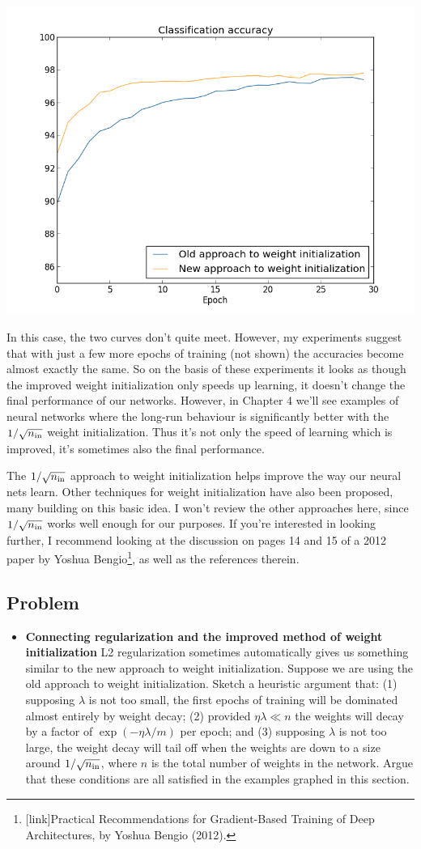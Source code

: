 \documentclass[a4paper,twoside,10pt]{book}
\begin{document}
\begin{center}
	\includegraphics[width=0.7\linewidth]{figures/ch3/weight_initialization_100}
\end{center}
In this case, the two curves don't quite meet. However, my experiments suggest that with just a few more epochs of training (not shown) the accuracies become almost exactly the same. So on the basis of these experiments it looks as though the improved weight initialization only speeds up learning, it doesn't change the final performance of our networks. However, in Chapter 4 we'll see examples of neural networks where the long-run behaviour is significantly better with the $1/\sqrt{n_{\rm in}}$ weight initialization. Thus it's not only the speed of learning which is improved, it's sometimes also the final performance.

The $1/\sqrt{n_{\rm in}}$ approach to weight initialization helps improve the way our neural nets learn. Other techniques for weight initialization have also been proposed, many building on this basic idea. I won't review the other approaches here, since $1/\sqrt{n_{\rm in}}$ works well enough for our purposes. If you're interested in looking further, I recommend looking at the discussion on pages 14 and 15 of a 2012 paper by Yoshua Bengio\footnote{[link]Practical Recommendations for Gradient-Based Training of Deep Architectures, by Yoshua Bengio (2012).}, as well as the references therein.

\subsection*{Problem}
\begin{itemize}
	\item \textbf{Connecting regularization and the improved method of weight initialization} L2 regularization sometimes automatically gives us something similar to the new approach to weight initialization. Suppose we are using the old approach to weight initialization. Sketch a heuristic argument that: (1) supposing $\lambda$ is not too small, the first epochs of training will be dominated almost entirely by weight decay; (2) provided $\eta\lambda\ll n$ the weights will decay by a factor of $\exp(-\eta\lambda/m)$ per epoch; and (3) supposing $\lambda$ is not too large, the weight decay will tail off when the weights are down to a size around $1/\sqrt{n_{\rm in}}$, where $n$ is the total number of weights in the network. Argue that these conditions are all satisfied in the examples graphed in this section.
	\end{itemize}
\end{document}
